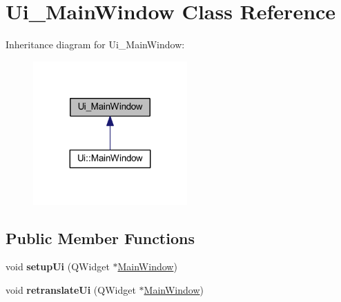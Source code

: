\hypertarget{class_ui___main_window}{}\section{Ui\+\_\+\+Main\+Window Class Reference}
\label{class_ui___main_window}


Inheritance diagram for Ui\+\_\+\+Main\+Window\+:\nopagebreak
\begin{figure}[H]
\begin{center}
\leavevmode
\includegraphics[width=167pt]{class_ui___main_window__inherit__graph}
\end{center}
\end{figure}
\subsection*{Public Member Functions}
\begin{DoxyCompactItemize}
\item 
\mbox{\label{class_ui___main_window_a306e3013ead511f9bc29513aa0219579}} 
void {\bfseries setup\+Ui} (Q\+Widget $\ast$\mbox{\hyperlink{class_main_window}{Main\+Window}})
\item 
\mbox{\label{class_ui___main_window_ae4964a56cb4d6d76b7a398fd76b200e2}} 
void {\bfseries retranslate\+Ui} (Q\+Widget $\ast$\mbox{\hyperlink{class_main_window}{Main\+Window}})
\end{DoxyCompactItemize}
